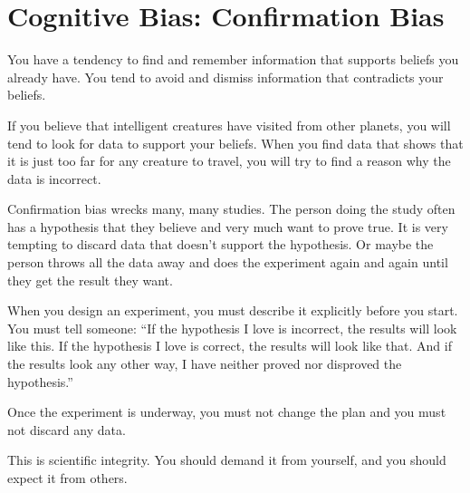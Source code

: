 
\section{Cognitive Bias: Confirmation Bias}

You have a tendency to find and remember information that supports
beliefs you already have. You tend to avoid and dismiss information
that contradicts your beliefs.

If you believe that intelligent creatures have visited from other
planets, you will tend to look for data to support your beliefs.  When
you find data that shows that it is just too far for any creature to
travel, you will try to find a reason why the data is incorrect.

Confirmation bias wrecks many, many studies. The person doing the
study often has a hypothesis that they believe and very much want to
prove true.  It is very tempting to discard data that doesn't support
the hypothesis. Or maybe the person throws all the data away and does
the experiment again and again until they get the result they want.

When you design an experiment, you must describe it explicitly before
you start.  You must tell someone: ``If the hypothesis I love is
incorrect, the results will look like this.  If the hypothesis I love
is correct, the results will look like that. And if the results look
any other way, I have neither proved nor disproved the hypothesis.''

Once the experiment is underway, you must not change the plan and you
must not discard any data.

This is scientific integrity. You should demand it from yourself, and
you should expect it from others.
